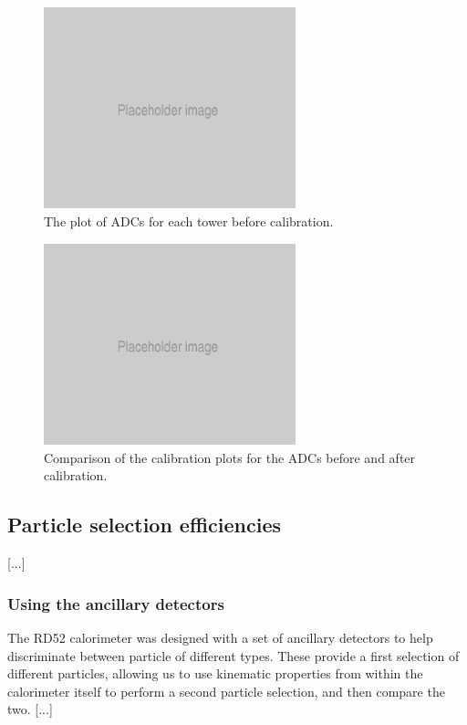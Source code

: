 \begin{figure}[h]
	\centering
	\includegraphics[width=0.65\textwidth]{../Pictures/Placeholder.png}
	\caption{The plot of ADCs for each tower before calibration.}
	\label{figure:testbeam/results/calibrationbefore}
\end{figure}

\begin{figure}[h]
	\centering
	\includegraphics[width=0.65\textwidth]{../Pictures/Placeholder.png}
	\caption{Comparison of the calibration plots for the ADCs before and after calibration.}
	\label{figure:testbeam/results/calibrationafter}
\end{figure}

\subsection{Particle selection efficiencies}
[...]

\subsubsection{Using the ancillary detectors}

The RD52 calorimeter was designed with a set of ancillary detectors to help discriminate between particle of different types. These provide a first selection of different particles, allowing us to use kinematic properties from within the calorimeter itself to perform a second particle selection, and then compare the two. [...]

